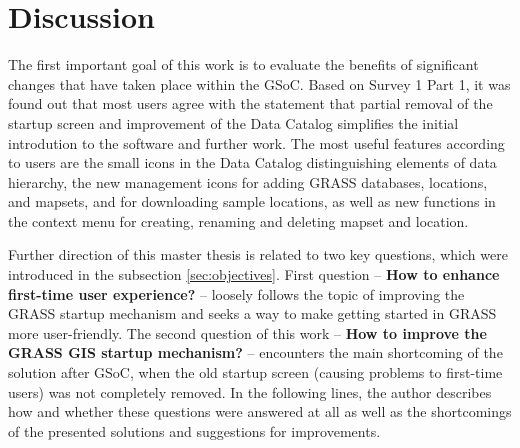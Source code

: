 \documentclass[a4paper,10pt,twoside]{article}
\begin{document}
\newpage
\vspace*{-1cm}
\section*{Discussion}
\noindent
\large

\noindent The first important goal of this work is to evaluate the
benefits of significant changes that have taken place within the
GSoC. Based on Survey 1 Part 1, it was found out that most users agree
with the statement that partial removal of the startup screen and
improvement of the Data Catalog simplifies the initial introdution to
the software and further work. The most useful features according to
users are the small icons in the Data Catalog distinguishing elements
of data hierarchy, the new management icons for adding GRASS databases,
locations, and mapsets, and for downloading sample locations, as well as
new functions in the context menu for creating, renaming and deleting
mapset and location.

Further direction of this master thesis is related to two key
questions, which were introduced in the subsection
\ref{sec:objectives}. First question -- \textbf{How to enhance
  first-time user experience?} -- loosely follows the topic of
improving the GRASS startup mechanism and seeks a way to make getting
started in GRASS more user-friendly. The second question of this work
-- \textbf{How to improve the GRASS GIS startup mechanism?} --
encounters the main shortcoming of the solution after GSoC, when the
old startup screen (causing problems to first-time users) was not
completely removed. In the following lines, the author describes how
and whether these questions were answered at all as well as the
shortcomings of the presented solutions and suggestions for
improvements.
\end{document}
